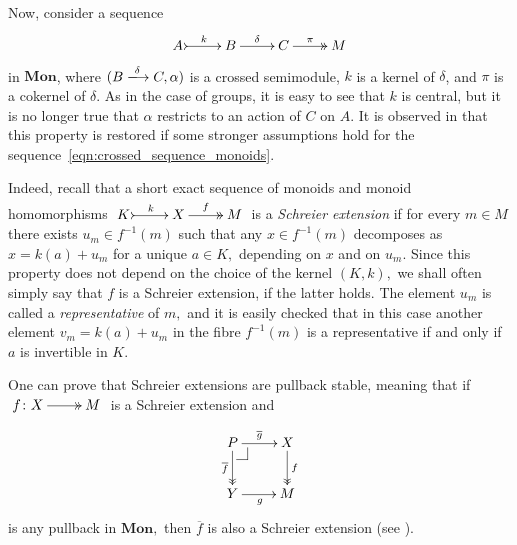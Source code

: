 \documentclass[a4paper]{amsart}
\makeatletter
\theoremstyle{plain}
\theoremstyle{definition}
\theoremstyle{remark}
\newcommand{\pullback}[4]{{#1 \leftindex_{#2}{\times}_{#3} #4}}
\def\pullback{%
 \ar@{-}[]+R+<4pt,-3pt>;[]+RD+<4pt,-6pt>%
 \ar@{-}[]+D+<3pt,-6pt>;[]+RD+<4pt,-6pt>}
\makeatother
\begin{document}
Now, consider a sequence
\begin{equation}
\label{eqn:crossed_sequence_monoids}
\xymatrix{
A \ar@{>->}[r]^-k &B \ar[r]^-{\delta} &C \ar@{->>}[r]^-{\pi} &M
}
\end{equation}
in $\mathbf{Mon}$, where $(B\xlongrightarrow{\delta} C,\alpha)$ is a crossed semimodule, $k$ is a kernel of $\delta$, and $\pi$ is a cokernel of $\delta$. As in the case of groups, it is easy to see that $k$ is central, but it is no longer true that $\alpha$ restricts to an action of $C$ on $A.$ It is observed in \cite{AMMPS} that this property is restored if some stronger assumptions hold for the sequence~\eqref{eqn:crossed_sequence_monoids}.

Indeed, recall that a short exact sequence of monoids and monoid homomorphisms $\xymatrix{K \ar@{>->}[r]^-{k} &X \ar@{->>}[r]^-{f} &M}$ is a \emph{Schreier extension} \cite{Redei} if for every $m\in M$ there exists $u_m\in f^{-1}(m)$ such that any $x\in f^{-1}(m)$ decomposes as $x=k(a)+u_m$ for a unique $a\in K,$ depending on $x$ and on $u_m.$ Since this property does not depend on the choice of the kernel $(K,k),$ we shall often simply say that $f$ is a Schreier extension, if the latter holds. The element $u_m$ is called a \emph{representative} of $m,$ and it is easily checked that in this case another element $v_m=k(a)+u_m$ in the fibre $f^{-1}(m)$ is a representative if and only if $a$ is invertible in $K.$

One can prove that Schreier extensions are pullback stable, meaning that if $\xymatrix{{f\colon X} \ar@{->>}[r] &M}$ is a Schreier extension and
\begin{equation*}
\xymatrix{
P \pullback\ar@{->>}[d]_-{\overline{f}} \ar[r]^-{\overline{g}} &X \ar@{->>}[d]^-f \\
Y \ar[r]_g &M
}
\end{equation*}
is any pullback in $\mathbf{Mon},$ then $\overline{f}$ is also a Schreier extension (see \cite{AMMPS}).
\end{document}
